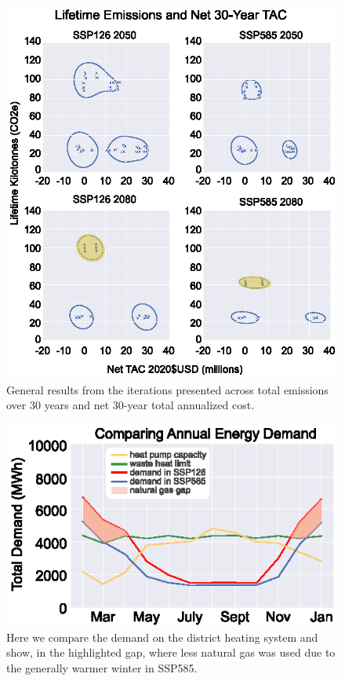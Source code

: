 \documentclass[twocolumn, a4paper,10pt]{article}
\begin{document}
\begin{figure}[t]
    \centering
    \captionsetup{margin=.5cm}
    \includegraphics[scale=0.8]{figures/general_results_box.eps}
    \caption{General results from the iterations presented across total emissions over 30 years and net 30-year total annualized cost.}
    \label{fig:cross_plot}
\end{figure}

\begin{figure}[t]
    \centering
    \includegraphics[scale=1.15]{figures/district_heat_charts.eps}
    \caption{Here we compare the demand on the district heating system and show, in the highlighted gap, where less natural gas was used due to the generally warmer winter in SSP585.}
    \label{fig:compare_district}
\end{figure}
\end{document}
